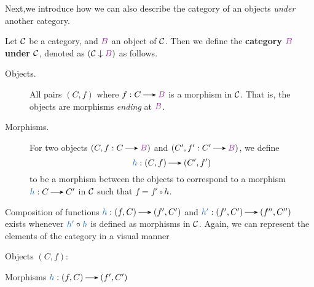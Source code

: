     Next,we introduce how we can also describe the category of an objects \textit{under}
        another category. 
        \begin{definition}
            Let $\mathcal{C}$ be a category, and $\textcolor{Purple}{B}$ an object of $\mathcal{C}$. Then
            we define the \textbf{category $\textcolor{Purple}{B}$ under $\mathcal{C}$}, denoted as
            $(\cc \downarrow \textcolor{Purple}{B})$ as follows.
            \begin{description}
                \item[Objects.] All 
                pairs $(C, f)$ where $f: C \to \textcolor{Purple}{B}$
                is a morphism in $\mathcal{C}$. That is, the objects are morphisms \emph{ending} 
                at $\textcolor{Purple}{B}$. 

                \item[Morphisms.] For two objects $(C, f: C  \to \textcolor{Purple}{B})$
                and $(C', f': C'  \to \textcolor{Purple}{B})$, we define
                \[ 
                    \textcolor{NavyBlue}{h}: (C, f) \to (C', f')
                \] 
                to be a morphism between the objects to correspond  to  a morphism
                $\textcolor{NavyBlue}{h}:C \to C'$ in $\mathcal{C}$ 
                such that $f = f' \circ h$.  
            \end{description}
        \end{definition}
        Composition of functions $\textcolor{NavyBlue}{h}: (f, C) \to (f', C')$ and
        $\textcolor{NavyBlue}{h'}: (f', C') \to (f'', C'')$ exists whenever 
        $\textcolor{NavyBlue}{h'} \circ \textcolor{NavyBlue}{h}$ is
        defined as morphisms in $\mathcal{C}$. Again, we can represent the
        elements of the category in a visual manner 
        \begin{center}
            Objects $(C, f)$:
            \hspace{1cm}
            Morphisms $\textcolor{NavyBlue}{h}: (f, C) \to (f', C')$
        \end{center}

